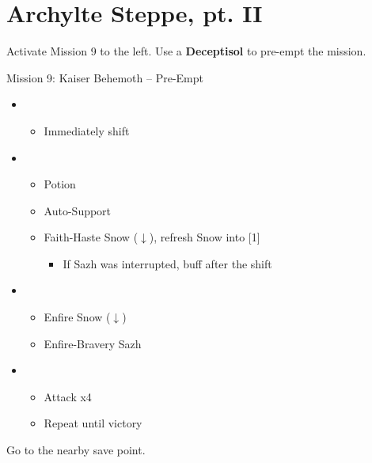 \chapter{Archylte Steppe, pt. II}

Activate Mission 9 to the left.
Use a \textbf{Deceptisol} to pre-empt the mission.

\begin{battle}{Mission 9: Kaiser Behemoth -- Pre-Empt}
	\begin{itemize}
		\item \sixth
			\begin{itemize}
				\item Immediately shift
			\end{itemize}
		\item \fourth
			\begin{itemize}
				\item Potion
				\item Auto-Support
				\item Faith-Haste Snow ($\downarrow$), refresh Snow into [1]
					\begin{itemize}
						\item If Sazh was interrupted, buff after the shift
					\end{itemize}
			\end{itemize}
		\item \first
			\begin{itemize}
				\item Enfire Snow ($\downarrow$)
				\item Enfire-Bravery Sazh
			\end{itemize}
		\item \fifth
			\begin{itemize}
				\item Attack x4
				\item Repeat until victory
			\end{itemize}
	\end{itemize}
\end{battle}

Go to the nearby save point.

